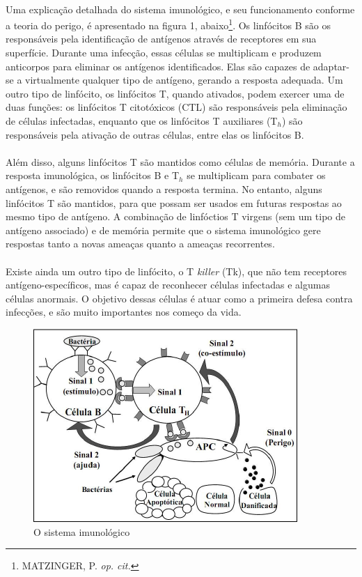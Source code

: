 \documentclass{article}
\begin{document}
\paragraph{}Uma explicação detalhada do sistema imunológico, e seu funcionamento conforme a teoria do perigo, é apresentado na figura 1, abaixo\footnote{MATZINGER, P. \emph{op. cit.}}. Os linfócitos B são os responsáveis pela identificação de antígenos através de receptores em sua superfície. Durante uma infecção, essas células se multiplicam e produzem anticorpos para eliminar os antígenos identificados. Elas são capazes de adaptar-se a virtualmente qualquer tipo de antígeno, gerando a resposta adequada. Um outro tipo de linfócito, os linfócitos T, quando ativados, podem exercer uma de duas funções: os linfócitos T citotóxicos (CTL) são responsáveis pela eliminação de células infectadas, enquanto que os linfócitos T auxiliares (T$_{h}$) são responsáveis pela ativação de outras células, entre elas os linfócitos B.

\paragraph{}Além disso, alguns linfócitos T são mantidos como células de memória. Durante a resposta imunológica, os linfócitos B e T$_{h}$ se multiplicam para combater os antígenos, e são removidos quando a resposta termina. No entanto, alguns linfócitos T são mantidos, para que possam ser usados em futuras respostas ao mesmo tipo de antígeno. A combinação de linfóctios T virgens (sem um tipo de antígeno associado) e de memória permite que o sistema imunológico gere respostas tanto a novas ameaças quanto a ameaças recorrentes.

\paragraph{}Existe ainda um outro tipo de linfócito, o T \emph{killer} (Tk), que não tem receptores antígeno-específicos, mas é capaz de reconhecer células infectadas e algumas células anormais. O objetivo dessas células é atuar como a primeira defesa contra infecções, e são muito importantes nos começo da vida.


\begin{figure}[h]
\centering
\includegraphics[scale=0.75]{img/danger_theory.png}
\caption{O sistema imunológico}
\end{figure}
\end{document}
